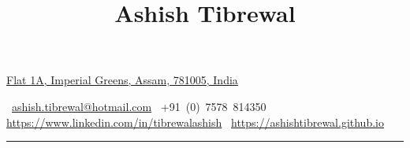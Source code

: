 \documentclass[a4paper,10pt,oneside]{article}
\begin{document}

\title{Ashish Tibrewal}

\begin{subtitle}
\href{https://www.google.co.in/maps/place/Imperial+Greens,+Nilomani+Phukan+Path,+Sree+Nagar,+Guwahati,+Assam+781006/@26.1584353,91.7778835,17z/data=!3m1!4b1!4m5!3m4!1s0x375a5911b086b2d7:0x2514b3388c04c7fc!8m2!3d26.1584353!4d91.7800722}
{Flat 1A, Imperial Greens, Assam, 781005, India}
\par
\faEnvelope\,
\href{mailto:ashish.tibrewal@hotmail.com}
{ashish.tibrewal@hotmail.com}
\hfill \faPhone\,
+91~(0)~7578~814350
\hfill \faLinkedinSquare\,
\href{https://www.linkedin.com/in/tibrewalashish}
{https://www.linkedin.com/in/tibrewalashish}
\hfill \faBriefcase\,
\href{https://ashishtibrewal.github.io}
{https://ashishtibrewal.github.io}
\vspace{8pt}
\hrule
\end{subtitle}
\end{document}
